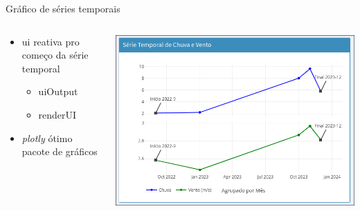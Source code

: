 \documentclass[aspectratio=1610]{beamer}
\begin{document}
\begin{frame}{Gráfico de séries temporais}
    \begin{columns}
        \begin{column}{0.5\textwidth}
            \begin{itemize}
                \item ui reativa pro começo da série temporal
                \begin{itemize}
                    \item uiOutput
                    \item renderUI
                \end{itemize}
                \item \textit{plotly} ótimo pacote de gráficos
            \end{itemize}
            \begin{tcolorbox}[title=Código,colback=wcprimary10,colbacktitle=wcprimary,colframe=white,fontlower=\small]
            \end{tcolorbox}
        \end{column}
        \begin{column}{0.5\textwidth}
            \includegraphics[width=\textwidth]{serie_temporal.png}
        \end{column}
    \end{columns}
\end{frame}
\end{document}
